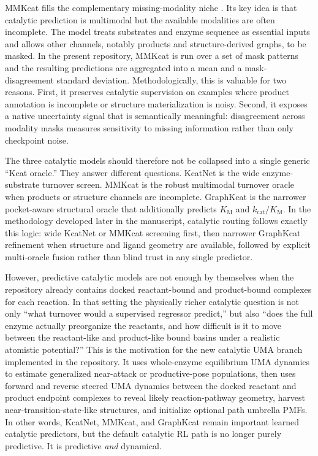 \documentclass[11pt]{article}
\newcommand{\Km}{\ensuremath{K_{\mathrm M}}}
\newcommand{\kcatKm}{\ensuremath{k_{\mathrm{cat}}/K_{\mathrm M}}}
\begin{document}
	MMKcat fills the complementary missing-modality niche \citep{sun2025mmkcat}. Its key idea is that catalytic prediction is multimodal but the available modalities are often incomplete. The model treats substrates and enzyme sequence as essential inputs and allows other channels, notably products and structure-derived graphs, to be masked. In the present repository, MMKcat is run over a set of mask patterns and the resulting predictions are aggregated into a mean and a mask-disagreement standard deviation. Methodologically, this is valuable for two reasons. First, it preserves catalytic supervision on examples where product annotation is incomplete or structure materialization is noisy. Second, it exposes a native uncertainty signal that is semantically meaningful: disagreement across modality masks measures sensitivity to missing information rather than only checkpoint noise.
	
	The three catalytic models should therefore not be collapsed into a single generic ``Kcat oracle.'' They answer different questions. KcatNet is the wide enzyme-substrate turnover screen. MMKcat is the robust multimodal turnover oracle when products or structure channels are incomplete. GraphKcat is the narrower pocket-aware structural oracle that additionally predicts $\Km$ and $\kcatKm$. In the methodology developed later in the manuscript, catalytic routing follows exactly this logic: wide KcatNet or MMKcat screening first, then narrower GraphKcat refinement when structure and ligand geometry are available, followed by explicit multi-oracle fusion rather than blind trust in any single predictor.
	
	However, predictive catalytic models are not enough by themselves when the repository already contains docked reactant-bound and product-bound complexes for each reaction. In that setting the physically richer catalytic question is not only ``what turnover would a supervised regressor predict,'' but also ``does the full enzyme actually preorganize the reactants, and how difficult is it to move between the reactant-like and product-like bound basins under a realistic atomistic potential?'' This is the motivation for the new catalytic UMA branch implemented in the repository. It uses whole-enzyme equilibrium UMA dynamics to estimate generalized near-attack or productive-pose populations, then uses forward and reverse steered UMA dynamics between the docked reactant and product endpoint complexes to reveal likely reaction-pathway geometry, harvest near-transition-state-like structures, and initialize optional path umbrella PMFs. In other words, KcatNet, MMKcat, and GraphKcat remain important learned catalytic predictors, but the default catalytic RL path is no longer purely predictive. It is predictive \emph{and} dynamical.
	
\end{document}
